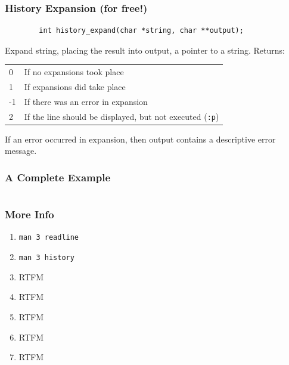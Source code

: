 \documentclass{beamer}
\begin{document}
\begin{frame}[fragile]
    \frametitle{History Expansion (for free!)}
    \begin{verbatim}
        int history_expand(char *string, char **output);
    \end{verbatim}

    Expand string, placing the result into output, a pointer to a string.  Returns:
    \begin{tabular}{l l}
        0 &    If no expansions took place \\
        1 &    If expansions did take place \\
        -1 &   If there was an error in expansion \\
        2 &    If the line should be displayed, but not executed (\texttt{:p}) \\
    \end{tabular}

    If an error occurred in expansion, then output contains a descriptive error
    message.
\end{frame}

\begin{frame}[fragile]
    \frametitle{A Complete Example}
    \tiny
    \inputminted[linenos]{c}{codesnip/progexample.c}
\end{frame}

\begin{frame}
    \frametitle{More Info}
    \begin{enumerate}[<+->]
        \item \texttt{man 3 readline}
        \item \texttt{man 3 history}
        \item RTFM
        \item RTFM
        \item RTFM
        \item RTFM
        \item RTFM
    \end{enumerate}
\end{frame}
\end{document}
